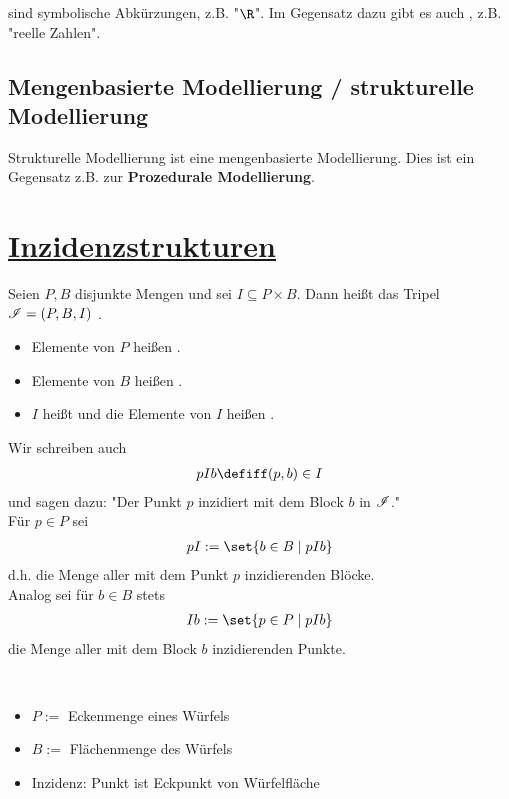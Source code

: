  sind symbolische Abkürzungen, z.B. "$\R$".
Im Gegensatz dazu gibt es auch , z.B. "reelle Zahlen".

\subsection{Mengenbasierte Modellierung / strukturelle Modellierung}

Strukturelle Modellierung ist eine mengenbasierte Modellierung.
Dies ist ein Gegensatz z.B. zur \textbf{Prozedurale Modellierung}.

\section{\href{https://de.wikipedia.org/wiki/Inzidenzstruktur}{Inzidenzstrukturen}}
\begin{definition}
	Seien $P,B$ disjunkte Mengen und sei $I\subseteq P\times B$.
	Dann heißt das Tripel $\mathscr{I}=(P,B,I)$ .
	\begin{itemize}
		\item Elemente von $P$ heißen .
		\item Elemente von $B$ heißen .
		\item $I$ heißt  und die Elemente von $I$ heißen .
	\end{itemize}
	Wir schreiben auch
	\begin{align*}
		pIb\defiff (p,b)\in I
	\end{align*}
	und sagen dazu:
	"Der Punkt $p$ inzidiert mit dem Block $b$ in $\mathscr{I}$."\\
	Für $p\in P$ sei
	\begin{align*}
		pI:=\set{b\in B\mid pIb}
	\end{align*}
	d.h. die Menge aller mit dem Punkt $p$ inzidierenden Blöcke.\\
	Analog sei für $b\in B$ stets
	\begin{align*}
		Ib:=\set{p\in P\mid pIb}
	\end{align*}
	die Menge aller mit dem Block $b$ inzidierenden Punkte.
\end{definition}

\begin{beispiel}\
	\begin{itemize}
		\item $P:=$ Eckenmenge eines Würfels
		\item $B:=$ Flächenmenge des Würfels
		\item Inzidenz: Punkt ist Eckpunkt von Würfelfläche
	\end{itemize}
\end{beispiel}

